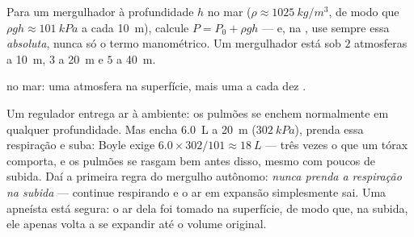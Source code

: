 \begin{method}\label{met:g10:pressure:dive}
Para um mergulhador à profundidade $h$ no mar
($\rho \approx \qty{1025}{kg/m^3}$, de modo que
$\rho g h \approx \qty{101}{kPa}$ a cada \qty{10}{m}), calcule
$P = P_0 + \rho g h$ --- e, na , use sempre essa 
\emph{absoluta}, nunca só o termo manométrico. Um
mergulhador está sob $2$ atmosferas a \qty{10}{m}, $3$ a \qty{20}{m} e
$5$ a \qty{40}{m}.
\end{method}

\begin{omfigure}

{\small {} no mar: uma atmosfera na superfície, mais uma a
cada dez .}
\end{omfigure}

\begin{remark}\label{rem:g10:pressure:breath}
Um regulador entrega ar à  ambiente: os pulmões se enchem
normalmente em qualquer profundidade. Mas encha \qty{6.0}{L} a
\qty{20}{m} ($\qty{302}{kPa}$), prenda essa respiração e suba: Boyle
exige $6.0 \times 302/101 \approx \qty{18}{L}$ --- três vezes o que um
tórax comporta, e os pulmões se rasgam bem antes disso, mesmo com poucos
 de subida. Daí a primeira regra do mergulho autônomo: \emph{nunca
prenda a respiração na subida} --- continue respirando e o ar em expansão
simplesmente sai. Uma apneísta está segura: o ar dela foi tomado na
superfície, de modo que, na subida, ele apenas volta a se expandir até o
volume original.
\end{remark}


